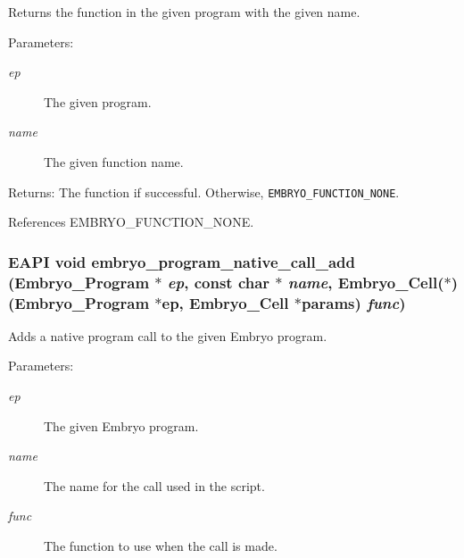 Returns the function in the given program with the given name. 

\begin{Desc}
\item[Parameters:]
\begin{description}
\item[{\em ep}]The given program. \item[{\em name}]The given function name. \end{description}
\end{Desc}
\begin{Desc}
\item[Returns:]The function if successful. Otherwise, {\tt EMBRYO\_\-FUNCTION\_\-NONE}. \end{Desc}


References EMBRYO\_\-FUNCTION\_\-NONE.\hypertarget{group__Embryo__Func__Group_g1164bbcc4dc623c54a1916f05499c9cb}{
\subsubsection{\setlength{\rightskip}{0pt plus 5cm}EAPI void embryo\_\-program\_\-native\_\-call\_\-add (Embryo\_\-Program $\ast$ {\em ep}, \/  const char $\ast$ {\em name}, \/  Embryo\_\-Cell($\ast$)(Embryo\_\-Program $\ast$ep, Embryo\_\-Cell $\ast$params) {\em func})}}
\label{group__Embryo__Func__Group_g1164bbcc4dc623c54a1916f05499c9cb}


Adds a native program call to the given Embryo program. 

\begin{Desc}
\item[Parameters:]
\begin{description}
\item[{\em ep}]The given Embryo program. \item[{\em name}]The name for the call used in the script. \item[{\em func}]The function to use when the call is made. \end{description}
\end{Desc}
